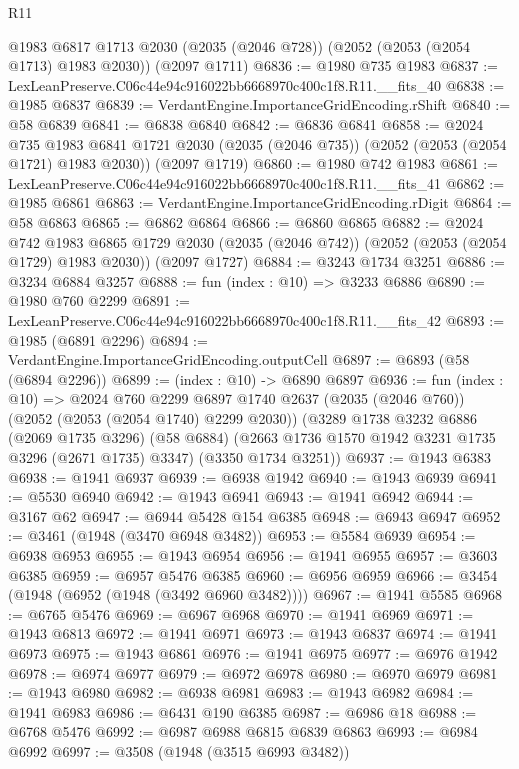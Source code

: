 \begin{lexlean}{R11}
\begin{coremodule}
    @1983
    @6817
    @1713
    @2030
    (@2035 (@2046 @728))
    (@2052 (@2053 (@2054 @1713) @1983 @2030))
    (@2097 @1711)
@6836 := @1980 @735 @1983
@6837 := LexLeanPreserve.C06c44e94c916022bb6668970c400c1f8.R11.__fits_40
@6838 := @1985 @6837
@6839 := VerdantEngine.ImportanceGridEncoding.rShift
@6840 := @58 @6839
@6841 := @6838 @6840
@6842 := @6836 @6841
@6858 := @2024
    @735
    @1983
    @6841
    @1721
    @2030
    (@2035 (@2046 @735))
    (@2052 (@2053 (@2054 @1721) @1983 @2030))
    (@2097 @1719)
@6860 := @1980 @742 @1983
@6861 := LexLeanPreserve.C06c44e94c916022bb6668970c400c1f8.R11.__fits_41
@6862 := @1985 @6861
@6863 := VerdantEngine.ImportanceGridEncoding.rDigit
@6864 := @58 @6863
@6865 := @6862 @6864
@6866 := @6860 @6865
@6882 := @2024
    @742
    @1983
    @6865
    @1729
    @2030
    (@2035 (@2046 @742))
    (@2052 (@2053 (@2054 @1729) @1983 @2030))
    (@2097 @1727)
@6884 := @3243 @1734 @3251
@6886 := @3234 @6884 @3257
@6888 := fun (index : @10) => @3233 @6886
@6890 := @1980 @760 @2299
@6891 := LexLeanPreserve.C06c44e94c916022bb6668970c400c1f8.R11.__fits_42
@6893 := @1985 (@6891 @2296)
@6894 := VerdantEngine.ImportanceGridEncoding.outputCell
@6897 := @6893 (@58 (@6894 @2296))
@6899 := (index : @10) -> @6890 @6897
@6936 := fun (index : @10) =>
  @2024
    @760
    @2299
    @6897
    @1740
    @2637
    (@2035 (@2046 @760))
    (@2052 (@2053 (@2054 @1740) @2299 @2030))
    (@3289
      @1738
      @3232
      @6886
      (@2069 @1735 @3296)
      (@58 @6884)
      (@2663 @1736 @1570 @1942 @3231 @1735 @3296 (@2671 @1735) @3347)
      (@3350 @1734 @3251))
@6937 := @1943 @6383
@6938 := @1941 @6937
@6939 := @6938 @1942
@6940 := @1943 @6939
@6941 := @5530 @6940
@6942 := @1943 @6941
@6943 := @1941 @6942
@6944 := @3167 @62
@6947 := @6944 @5428 @154 @6385
@6948 := @6943 @6947
@6952 := @3461 (@1948 (@3470 @6948 @3482))
@6953 := @5584 @6939
@6954 := @6938 @6953
@6955 := @1943 @6954
@6956 := @1941 @6955
@6957 := @3603 @6385
@6959 := @6957 @5476 @6385
@6960 := @6956 @6959
@6966 := @3454 (@1948 (@6952 (@1948 (@3492 @6960 @3482))))
@6967 := @1941 @5585
@6968 := @6765 @5476
@6969 := @6967 @6968
@6970 := @1941 @6969
@6971 := @1943 @6813
@6972 := @1941 @6971
@6973 := @1943 @6837
@6974 := @1941 @6973
@6975 := @1943 @6861
@6976 := @1941 @6975
@6977 := @6976 @1942
@6978 := @6974 @6977
@6979 := @6972 @6978
@6980 := @6970 @6979
@6981 := @1943 @6980
@6982 := @6938 @6981
@6983 := @1943 @6982
@6984 := @1941 @6983
@6986 := @6431 @190 @6385
@6987 := @6986 @18
@6988 := @6768 @5476
@6992 := @6987 @6988 @6815 @6839 @6863
@6993 := @6984 @6992
@6997 := @3508 (@1948 (@3515 @6993 @3482))

\end{coremodule}
\end{lexlean}

